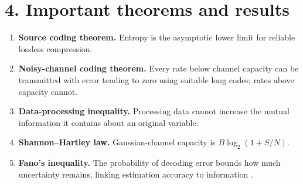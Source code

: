 \section*{4. Important theorems and results}
\begin{enumerate}[leftmargin=*,itemsep=0.35em]
\item \textbf{Source coding theorem.} Entropy is the asymptotic lower limit for reliable lossless compression.

\item \textbf{Noisy-channel coding theorem.} Every rate below channel capacity can be transmitted with error tending to zero using suitable long codes; rates above capacity cannot.

\item \textbf{Data-processing inequality.} Processing data cannot increase the mutual information it contains about an original variable.

\item \textbf{Shannon--Hartley law.} Gaussian-channel capacity is $B\log_2(1+S/N)$.

\item \textbf{Fano's inequality.} The probability of decoding error bounds how much uncertainty remains, linking estimation accuracy to information \cite{information_theory_ref1}.
\end{enumerate}

\theoryapplications
{}
